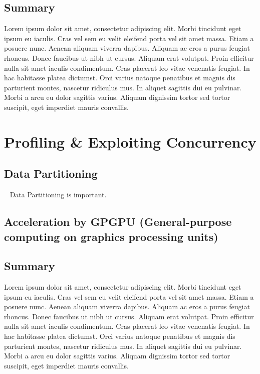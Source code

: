 \documentclass[openany]{book}
\begin{document}
\section{Summary}
Lorem ipsum dolor sit amet, consectetur adipiscing elit. Morbi tincidunt eget 
ipsum eu iaculis. Cras vel sem eu velit eleifend porta vel sit amet massa. Etiam 
a posuere nunc. Aenean aliquam viverra dapibus. Aliquam ac eros a purus feugiat 
rhoncus. Donec faucibus ut nibh ut cursus. Aliquam erat volutpat. Proin efficitur 
nulla sit amet iaculis condimentum. Cras placerat leo vitae venenatis feugiat. In 
hac habitasse platea dictumst. Orci varius natoque penatibus et magnis dis 
parturient montes, nascetur ridiculus mus. In aliquet sagittis dui eu pulvinar. 
Morbi a arcu eu dolor sagittis varius. Aliquam dignissim tortor sed tortor 
suscipit, eget imperdiet mauris convallis.



\chapter{Profiling \& Exploiting Concurrency}
\section{Data Partitioning}~\cite[p.~357]{Lang17}
Data Partitioning is important.



\section[Acceleration by GPGPU]{Acceleration by GPGPU (General-purpose 
computing on graphics processing units)}


\section{Summary}
Lorem ipsum dolor sit amet, consectetur adipiscing elit. Morbi tincidunt eget 
ipsum eu iaculis. Cras vel sem eu velit eleifend porta vel sit amet massa. Etiam 
a posuere nunc. Aenean aliquam viverra dapibus. Aliquam ac eros a purus feugiat 
rhoncus. Donec faucibus ut nibh ut cursus. Aliquam erat volutpat. Proin efficitur 
nulla sit amet iaculis condimentum. Cras placerat leo vitae venenatis feugiat. In 
hac habitasse platea dictumst. Orci varius natoque penatibus et magnis dis 
parturient montes, nascetur ridiculus mus. In aliquet sagittis dui eu pulvinar. 
Morbi a arcu eu dolor sagittis varius. Aliquam dignissim tortor sed tortor 
suscipit, eget imperdiet mauris convallis.
\end{document}
